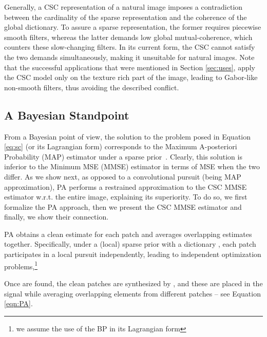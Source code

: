 \documentclass{article}
\begin{document}
Generally, a CSC representation of a natural image imposes a contradiction between the cardinality of the sparse representation  and the coherence of the global dictionary. To assure a sparse representation, the former requires piecewise smooth filters, whereas the latter demands low global mutual-coherence, which counters these slow-changing filters. In its current form, the CSC cannot satisfy the two demands simultaneously, making it unsuitable for natural images. Note that the successful applications that were mentioned in Section \ref{sec:uses}, apply the CSC model only on the texture rich part of the image, leading to Gabor-like non-smooth filters, thus avoiding the described conflict.



\subsection{A Bayesian Standpoint}
\label{sec:bayes}
From a Bayesian point of view, the solution to the problem posed in Equation \eqref{eq:sc} (or its Lagrangian form) corresponds to the Maximum A-posteriori Probability (MAP) estimator under a sparse prior~\cite{larsson2007linear,schniter2008fast,eladweighted,simon2018mmse}. Clearly, this solution is inferior to the Minimum MSE (MMSE) estimator in terms of MSE when the two differ. As we show next, as opposed to a convolutional pursuit (being MAP approximation), PA performs a restrained approximation to the CSC MMSE estimator w.r.t. the entire image, explaining its superiority. To do so, we first formalize the PA approach, then we present the CSC MMSE estimator and finally, we show their connection.

PA obtains a clean estimate for each patch and averages overlapping estimates together. Specifically, under a (local) sparse prior with a dictionary , each patch participates in a local pursuit independently, leading to  independent optimization problems,\footnote{we assume the use of the BP in its Lagrangian form}

Once  are found, the clean patches are synthesized by , and these are placed in the signal while averaging overlapping elements from different patches -- see Equation \eqref{eqn:PA}.
\end{document}
